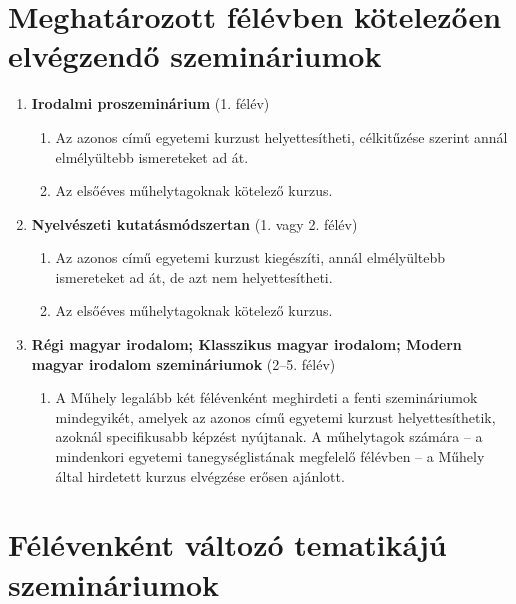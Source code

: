 \documentclass{../styles/curriculum}
\begin{document}
\section{Meghatározott félévben kötelezően elvégzendő szemináriumok}

\begin{enumerate}[label=\arabic*.]
	\item \textbf{Irodalmi proszeminárium} (1. félév) \begin{enumerate}
		\item Az azonos című egyetemi kurzust helyettesítheti, célkitűzése szerint annál elmélyültebb ismereteket ad át.
		\item Az elsőéves műhelytagoknak kötelező kurzus.
	\end{enumerate}
	\item \textbf{Nyelvészeti  kutatásmódszertan} (1. vagy 2. félév)
	\begin{enumerate}
		\item Az azonos című egyetemi kurzust kiegészíti, annál elmélyültebb ismereteket ad át, de azt nem helyettesítheti.
		\item Az elsőéves műhelytagoknak kötelező kurzus.
	\end{enumerate}
	\item \textbf{Régi magyar irodalom; Klasszikus magyar irodalom; Modern magyar irodalom szemináriumok} (2–5. félév)
	\begin{enumerate}
		\item A Műhely legalább két félévenként meghirdeti a fenti szemináriumok mindegyikét, amelyek az azonos című egyetemi kurzust helyettesíthetik, azoknál specifikusabb képzést nyújtanak. A műhelytagok számára -- a mindenkori egyetemi tanegységlistának megfelelő félévben -- a Műhely által hirdetett kurzus elvégzése erősen ajánlott.
	\end{enumerate}	
	
\end{enumerate}


\section{Félévenként változó tematikájú szemináriumok}
\end{document}
